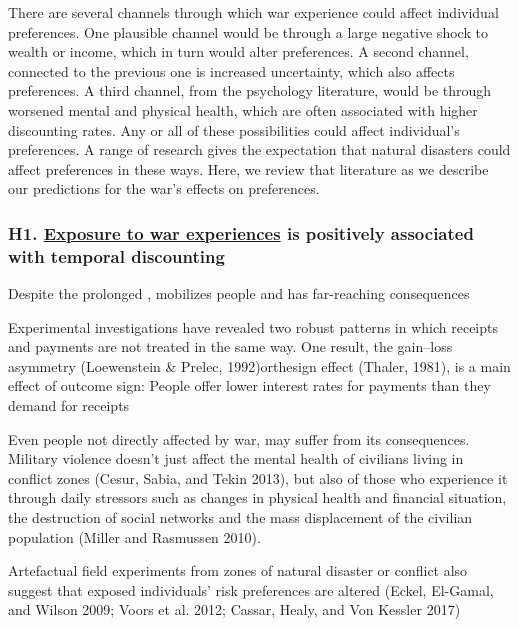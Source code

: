 \documentclass[
  letterpaper,
  DIV=11,
  numbers=noendperiod]{scrartcl}
\begin{document}
There are several channels through which war experience could affect
individual preferences. One plausible channel would be through a large
negative shock to wealth or income, which in turn would alter
preferences. A second channel, connected to the previous one is
increased uncertainty, which also affects preferences. A third channel,
from the psychology literature, would be through worsened mental and
physical health, which are often associated with higher discounting
rates. Any or all of these possibilities could affect individual's
preferences. A range of research gives the expectation that natural
disasters could affect preferences in these ways. Here, we review that
literature as we describe our predictions for the war's effects on
preferences.

\hypertarget{h1.-exposure-to-war-experiences-is-positively-associated-with-temporal-discounting}{%
\subsubsection{\texorpdfstring{H1. \ul{Exposure to war experiences} is
positively associated with temporal
discounting}{H1. Exposure to war experiences is positively associated with temporal discounting}}\label{h1.-exposure-to-war-experiences-is-positively-associated-with-temporal-discounting}}

Despite the prolonged , mobilizes people and has far-reaching
consequences

Experimental investigations have revealed two robust patterns in which
receipts and payments are not treated in the same way. One result, the
gain--loss asymmetry (Loewenstein \& Prelec, 1992)orthesign effect
(Thaler, 1981), is a main effect of outcome sign: People offer lower
interest rates for payments than they demand for receipts

Even people not directly affected by war, may suffer from its
consequences. Military violence doesn't just affect the mental health of
civilians living in conflict zones (Cesur, Sabia, and Tekin 2013), but
also of those who experience it through daily stressors such as changes
in physical health and financial situation, the destruction of social
networks and the mass displacement of the civilian population (Miller
and Rasmussen 2010).

Artefactual field experiments from zones of natural disaster or conflict
also suggest that exposed individuals' risk preferences are altered
(Eckel, El-Gamal, and Wilson 2009; Voors et al. 2012; Cassar, Healy, and
Von Kessler 2017)
\end{document}

